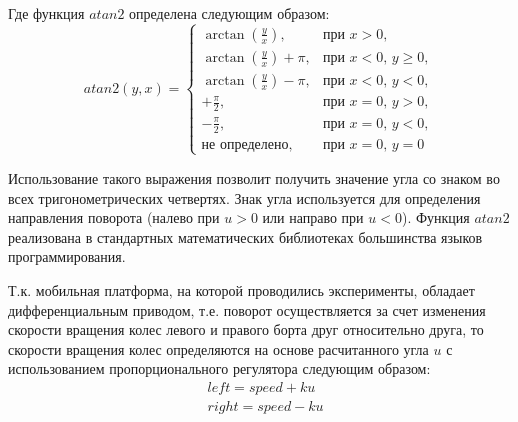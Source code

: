 Где функция $atan2$ определена следующим образом:
\begin{equation}
    atan2(y,x) =
        \begin{cases}
            \arctan(\frac{y}{x}),       & \text{при $x > 0$}, \\
            \arctan(\frac{y}{x}) + \pi, & \text{при $x < 0$, $y \geq 0$}, \\
            \arctan(\frac{y}{x}) - \pi, & \text{при $x < 0$, $y < 0$}, \\
            +\frac{\pi}{2},             & \text{при $x = 0$, $y > 0$}, \\
            -\frac{\pi}{2},             & \text{при $x = 0$, $y < 0$}, \\
            \text{не определено},       & \text{при $x = 0$, $y = 0$}
        \end{cases}
\end{equation}

Использование такого выражения позволит получить значение угла со знаком во всех тригонометрических четвертях.
Знак угла используется для определения направления поворота (налево при $u > 0$ или направо при $u < 0$). Функция $atan2$ реализована в
стандартных математических библиотеках большинства языков программирования.

Т.к. мобильная платформа, на которой проводились эксперименты, обладает дифференциальным приводом, т.е. поворот
осуществляется за счет изменения скорости вращения колес левого и правого борта друг относительно друга, то
скорости вращения колес определяются на основе расчитанного угла $u$ с использованием пропорционального регулятора
следующим образом:
\begin{align}
    &left = speed + ku \\
    &right = speed - ku
\end{align}